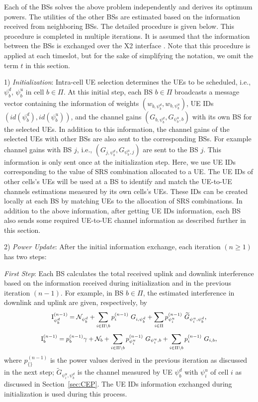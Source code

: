 \documentclass[journal]{IEEEtran}
\begin{document}
Each of the BSs solves the above problem independently and derives its optimum powers. The utilities of the other BSs are estimated based on the information received from neighboring BSs. 
The detailed procedure is given below. This procedure is completed in multiple iterations. It is assumed that the information between the BSs is exchanged over the X2 interface \cite{3GPP:4}. Note that this procedure is applied at each timeslot, but for the sake of simplifying the notation, we omit the term $t$ in this section. 

1) \textit{Initialization}:  Intra-cell UE selection determines the UEs to be scheduled, i.e., $\psi_b^d$, $\psi_b^u$ in cell $b\in\Pi$. At this initial step, each BS $b \in\Pi$ broadcasts a message vector containing the information of weights $(w_{b,\psi_b^d},w_{b,\psi_b^u})$, UE IDs $(id(\psi_b^d), id(\psi_b^u))$, and the channel gains $(G_{b,\psi_b^d}, G_{\psi_b^u,b})$ with its own BS for the selected UEs. In addition to this information, the channel gains of the selected UEs with other BSs are also sent to the corresponding BSs. For example channel gains with BS $j$, i.e., $(G_{j,\psi_b^d}, G_{\psi_b^u,j})$ are sent to the BS $j$. This information is only sent once at the initialization step. Here, we use UE IDs corresponding to the value of SRS combination allocated to a UE. The UE IDs of other cells's UEs will be used at a BS to identify and match the UE-to-UE channels estimations measured by its own cells's UEs. These IDs can be created locally at each BS by matching UEs to the allocation of SRS combinations. In addition to the above information, after getting UE IDs information, each BS also sends some required UE-to-UE channel information as described further in this section. 
  
2) \textit{Power Update}:  After the initial information exchange, each iteration $(n \geq 1)$ has two steps: 
	
\textit{First Step}: Each BS calculates the total received uplink and downlink interference based on the information received during initialization and in the previous iteration $(n-1)$. For example, in BS $b \in \Pi$, the estimated interference in downlink and uplink are given, respectively, by 
 \begin{equation}\label{DS10}
 \small{
     \boldsymbol{\text{I}}_{\psi_b^d}^{(n-1)}  =  \mathcal{N}_{\psi_b^d} + \sum\limits_{i \in \Pi\setminus b} p_i^{(n-1)}~{{G}_{i,\psi_b^d}} + \sum\limits_{i \in \Pi} p_{\psi_i^u}^{(n-1)}~\widetilde{G}_{\psi_i^u,\psi_b^d} ,
     }
\end{equation} 
\begin{equation}\label{DS11}
\small{
   \boldsymbol{\text{I}}_b^{(n-1)}  = p_b^{(n-1)} \gamma + \mathcal{N}_{b} +  \sum\limits_{i \in \Pi \setminus b} p_{\psi_i^u}^{(n-1)}~{G}_{\psi_i^u,b} + \sum\limits_{i\in \Pi\setminus b} p_i^{(n-1)}~{G}_{i,b},   
   }
\end{equation}  
where $p^{(n-1)}_{\{\}}$ is the power values derived in the previous iteration as discussed in the next step; $\widetilde{G}_{\psi_i^u,\psi_b^d}$ is the channel measured by UE $\psi_b^d$ with $\psi_i^u$ of cell $i$ as discussed in Section~\ref{sec:CEP}. The UE IDs information exchanged during initialization is used during this process.  
 
\end{document}
